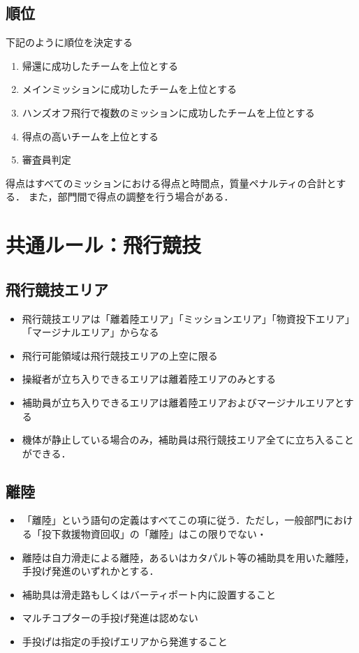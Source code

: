 \documentclass[a4paper,12pt,oneside]{jsarticle}
\begin{document}
\subsection{順位}
下記のように順位を決定する
\begin{enumerate}
  \item 帰還に成功したチームを上位とする
  \item メインミッションに成功したチームを上位とする
  \item ハンズオフ飛行で複数のミッションに成功したチームを上位とする
  \item 得点の高いチームを上位とする
  \item 審査員判定
\end{enumerate}
得点はすべてのミッションにおける得点と時間点，質量ペナルティの合計とする．
また，部門間で得点の調整を行う場合がある．

\section{共通ルール：飛行競技}
\subsection{飛行競技エリア}
\begin{itemize}
  \item 飛行競技エリアは「離着陸エリア」「ミッションエリア」「物資投下エリア」「マージナルエリア」からなる
  \item 飛行可能領域は飛行競技エリアの上空に限る
  \item 操縦者が立ち入りできるエリアは離着陸エリアのみとする
  \item 補助員が立ち入りできるエリアは離着陸エリアおよびマージナルエリアとする
  \item 機体が静止している場合のみ，補助員は飛行競技エリア全てに立ち入ることができる．
\end{itemize}

\subsection{離陸}
\begin{itemize}
  \item 「離陸」という語句の定義はすべてこの項に従う．ただし，一般部門における「投下救援物資回収」の「離陸」はこの限りでない・
  \item 離陸は自力滑走による離陸，あるいはカタパルト等の補助具を用いた離陸，手投げ発進のいずれかとする．
  \item 補助具は滑走路もしくはバーティポート内に設置すること
  \item マルチコプターの手投げ発進は認めない
  \item 手投げは指定の手投げエリアから発進すること
\end{itemize}
\end{document}
